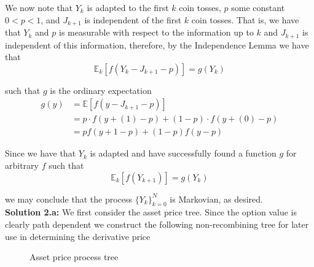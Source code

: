 \documentclass[12pt]{article}
\newlength\tindent
\renewcommand{\indent}{\hspace*{\tindent}}
\newcommand{\E}{\mathbb E}
\begin{document}
\indent We now note that $Y_k$ is adapted to the first $k$ coin tosses, $p$ some constant $0 < p < 1$, and $J_{k + 1}$ is independent of the first $k$ coin tosses. That is, we have that $Y_k$ and $p$ is measurable with respect to the information up to $k$ and $J_{k + 1}$ is independent of this information, therefore, by the Independence Lemma we have that
\begin{equation*}
	\E_k \left[ f \left( Y_k - J_{k + 1} - p \right) \right] = g(Y_k)
\end{equation*}

such that $g$ is the ordinary expectation
\begin{align*}
	g(y) &= \E \left[ f \left( y - J_{k + 1} - p \right) \right] \\
	&= p \cdot f(y + (1) - p) + (1 - p) \cdot f(y + (0) - p) \\
	&= pf(y + 1 - p) + (1 - p)f(y - p)
\end{align*}

\indent Since we have that $Y_k$ is adapted and have successfully found a function $g$ for arbitrary $f$ such that
\begin{equation*}
	\E_k \left[ f(Y_{k + 1}) \right] = g(Y_k)
\end{equation*}

we may conclude that the process $\{Y_k\}^N_{k = 0}$ is Markovian, as desired. \\

{\bf Solution 2.a:} We first consider the asset price tree. Since the option value is clearly path dependent we construct the following non-recombining tree for later use in determining the derivative price
\begin{figure}[H]
\caption{Asset price process tree}
\end{figure}
\end{document}
